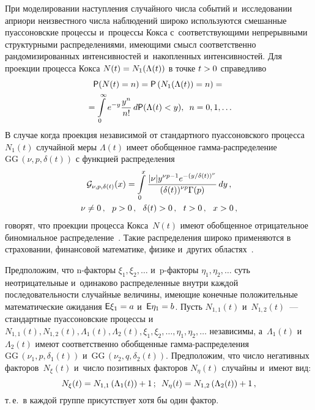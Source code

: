 \begin{multicols}{2}
При моделировании наступления случайного числа событий и~исследовании априори 
неизвестного числа наблюдений широко используются смешанные пуассоновские 
процессы
и~процессы Кокса
с~соответствующими непрерывными структурными распределениями, имеющими смысл 
соответственно рандомизированных интенсивностей и~накопленных интенсивностей.
Для проекции процесса Кокса $N(t)\hm=N_1(\Lambda (t))$ в точке $t\hm>0$ справедливо
\begin{multline*}
{\sf P}(N(t)=n)={\sf P}\left(N_1(\Lambda (t))=n\right)={}\\
{}=\int\limits_0^\infty e^{-y}\displaystyle\frac{\displaystyle y^n\mathstrut}{\displaystyle n!\mathstrut}\, 
d{\sf P}(\Lambda(t)<y),\enskip n=0,1,\ldots
\end{multline*}
В случае когда проекция независимой от стандартного пуассоновского процесса 
$N_1(t)$ случайной меры $\Lambda(t)$ имеет обобщенное гам\-ма-рас\-пре\-де\-ле\-ние~\cite{KrMe1946,KrMe1948} 
$\mathrm{GG}\,(\nu,p,\delta (t))$ с функцией распределения
\begin{multline*}
{\cal G}_{\nu,p,\delta(t)}(x)=\int\limits_0^x\fr{|\nu| y^{\nu p -1}e^{-(y/\delta(t))^\nu}}
{(\delta(t))^{\nu p}\Gamma(p)}\,dy\,, \\
\nu\neq0\,, \ \ p>0\,, \ 
\ \delta(t)>0\,, \ \ t>0\,,\ \ x>0\,,
\end{multline*}
говорят, что проекции процесса Кокса~$N(t)$ имеют обобщенное 
отрицательное биномиальное распределение~\cite{Ku2019_2}.
Такие распределения широко применяются в страховании, финансовой математике, 
физике и~других областях~\cite{KoZe2019,WaZhSu2019,KoGo2020,ZhWaYa2020,BhAh2021,MaThMoVePa2020}.

Предположим, что n-фак\-то\-ры $\xi_1,\xi_2,\ldots$ и~\mbox{p-фак}\-то\-ры 
$\eta_1,\eta_2,\ldots$ суть неотрицательные и~одинаково распределенные внутри 
каждой последовательности случайные величины, имеющие \mbox{конечные} положительные 
математические ожидания ${\sf E}\xi_1\hm=a$ и~${\sf E}\eta_1\hm=b$.
Пусть $N_{1,1}(t)$ и~$N_{1,2}(t)$~--- стандартные пуассоновские процессы 
и~$N_{1,1}(t),N_{1,2}(t),\Lambda_1(t),\Lambda_2(t),\xi_1,\xi_2,\ldots,\eta_1,\eta_
2,\ldots$ независимы, а~$\Lambda_1(t)$ и~$\Lambda_2(t)$ имеют соответственно 
обобщенные гам\-ма-рас\-пре\-де\-ле\-ния $\mathrm{GG}\,(\nu_1, p, \delta_1(t))$ и~$\mathrm{GG}\,(\nu_2, q, 
\delta_2(t))$.
Предположим, что число негативных факторов~$N_\xi(t)$ и~число позитивных 
факторов $N_\eta(t)$ случайны и~имеют вид:
$$
N_\xi(t)=N_{1,1}\left(\Lambda_1(t)\right)+1\,;\enskip N_\eta(t)=N_{1,2}\left(\Lambda_2(t)\right)+1\,,
$$
т.\,е.\ в каждой группе присутствует хотя бы один фактор.


\end{multicols}
